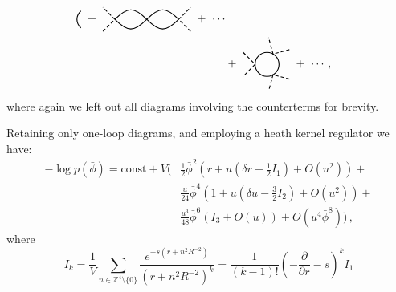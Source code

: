\documentclass[11pt,a4paper]{article}
\begin{document}
\begin{displaymath}
\begin{split}
\begin{tikzpicture}[scale=0.5, baseline={([yshift=-.5ex]current bounding box.center)}]
    \draw[thick] (0.53, -0.53) .. controls (0.2, -0.2) 
    and (0.2, 0.2) .. (0.53, 0.53);
\end{tikzpicture}
\ + \ 
\begin{tikzpicture}[scale=0.5, baseline={([yshift=-.5ex]current bounding box.center)}]
    \draw[thick, densely dashed] (-2.75, -0.75) -- (-2, 0) -- (-2.75, 0.75);
    \draw[thick, densely dashed] (2.75, -0.75) -- (2, 0) -- (2.75, 0.75);
    \draw[thick] (-2, 0) .. controls (-1.2, 0.8) and (-0.8, 0.8) .. (0, 0) .. 
    controls (-0.8, -0.8) and (-1.2, -0.8) .. (-2, 0);
    \draw[thick] (2, 0) .. controls (1.2, 0.8) and (0.8, 0.8) .. (0, 0) .. 
    controls (0.8, -0.8) and (1.2, -0.8) .. (2, 0);
\end{tikzpicture}
 \ + \ \cdots \\
& + \ 
\begin{tikzpicture}[scale=0.5, baseline={([yshift=-.5ex]current bounding box.center)}]
    \draw[thick, densely dashed] (-1.5, 0.75) -- (-0.75, 0) -- (-1.5, -0.75) ;
    \draw[thick] (0, 0) circle (0.75cm);
    \draw[thick, densely dashed] (1.40, -0.92) -- (0.375, -0.65) -- (0.1, -1.67);
    \draw[thick, densely dashed] (1.40, 0.92) -- (0.375, 0.65) -- (0.1, 1.67);
\end{tikzpicture}
 \ + \ \cdots \,,
\end{split}
\end{displaymath}
where again we left out all diagrams involving the counterterms for brevity. 

Retaining only one-loop diagrams, and employing a heath kernel regulator we have:
\begin{equation}
\begin{split}
    -\log p(\bar{\phi}) = \mathrm{const} + V \Bigg( 
    &\frac{1}{2} \bar{\phi}^2\left( r + u \left(\delta r + \frac{1}{2} I_1\right) + O(u^2)\right) + \\
    &\frac{u}{24} \bar{\phi}^4 \left(1 + u \left(\delta u - \frac{3}{2} I_2\right) + O(u^2)\right) + \\
    &\frac{u^3}{48}\bar{\phi}^6\left(I_3 + O(u)\right) + O(u^4 \bar{\phi}^8) \Bigg)\,,
\end{split}
\end{equation}
where
\begin{equation}
    I_k = \frac{1}{V} \sum_{n\in\mathbb{Z}^4\setminus\{0\}} 
    \frac{e^{-s(r + n^2 R^{-2})}}{\left(r + n^2 R^{-2}\right)^k} = 
    \frac{1}{(k - 1)!}\left(-\frac{\partial}{\partial r} - s\right)^k I_1
\end{equation}
\end{document}
